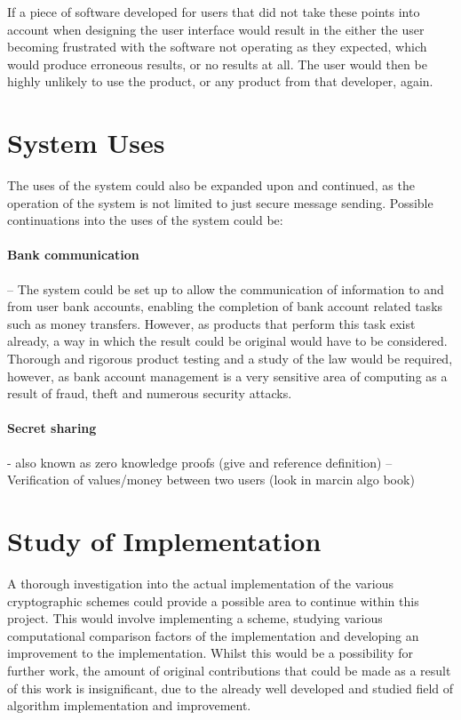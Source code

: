 \documentclass[a4paper,10pt]{report}
\begin{document}
If a piece of software developed for users that did not take these points into account when designing the user interface would result in the either the user becoming frustrated with the software not operating as they expected, which would produce erroneous results, or no results at all. The user would then be highly unlikely to use the product, or any product from that developer, again.
 
\section{System Uses}

The uses of the system could also be expanded upon and continued, as the operation of the system is not limited to just secure message sending. Possible continuations into the uses of the system could be:

\paragraph{Bank communication} – The system could be set up to allow the communication of information to and from user bank accounts, enabling the completion of bank account related tasks such as money transfers. However, as products that perform this task exist already, a way in which the result could be original would have to be considered. Thorough and rigorous product testing and a study of the law would be required, however, as bank account management is a very sensitive area of computing as a result of fraud, theft and numerous security attacks. 

\paragraph{Secret sharing} - also known as zero knowledge proofs (give and reference definition) – Verification of values/money between two users (look in marcin algo book)

\section{Study of Implementation}

A thorough investigation into the actual implementation of the various cryptographic schemes could provide a possible area to continue within this project. This would involve implementing a scheme, studying various computational comparison factors of the implementation and developing an improvement to the implementation. Whilst this would be a possibility for further work, the amount of original contributions that could be made as a result of this work is insignificant, due to the already well developed and studied field of algorithm implementation and improvement. 
\end{document}
